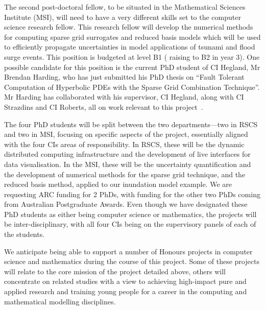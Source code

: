 The second post-doctoral fellow, to be
situated in the Mathematical Sciences Institute (MSI), 
will need to have a very different skills set to the computer 
science research fellow. This research fellow will develop
the numerical methods for computing sparse grid surrogates and reduced
basis models which will be used to efficiently propagate 
uncertainties in
model applications of tsunami and flood surge events. This 
position is budgeted at level B1 ( raising to B2 in year 3).
One possible candidate for this position is the current PhD 
student of CI Hegland, Mr Brendan Harding,  who has just 
submitted his PhD thesis on ``Fault Tolerant Computation of
Hyperbolic PDEs with the Sparse Grid Combination Technique''.
Mr Harding has collaborated with his supervisor, 
CI Hegland, along with CI Strazdins and CI Roberts, all
on work relevant to this project~\parencite{Ali11022016,AliEtal2015,deBaarHarding2015,
HardingHLS2015,StrazdinsEtal2015}.


The four PhD students will be split between the two departments---two
in RSCS and two in MSI, focusing on specific aspects of the project,
essentially aligned with the four CIs areas of responsibility.  In
RSCS, these will be the dynamic distributed computing infrastructure
and the development of live interfaces for data visualisation. In the
MSI, these will be the uncertainty quantification and the development
of numerical methods for the sparse grid technique, and the reduced
basis method, applied to our inundation model example.
We are requesting ARC funding for 2 PhDs, with funding for the other two PhDs coming 
from  Australian Postgraduate Awards.  Even though we have designated these 
PhD students as either being computer science or mathematics, the 
projects will be inter-disciplinary, with all four CIs being on the supervisory panels of 
each of the students. 

We anticipate being able to support a number of Honours projects in
computer science and mathematics during the course of this
project. Some of these projects will relate to the core mission of the
project detailed above, others will concentrate on related studies
with a view to achieving high-impact pure and applied research and
training young people for a career in the computing and mathematical
modelling disciplines.

